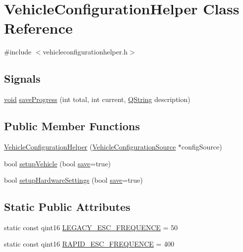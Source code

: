 \hypertarget{class_vehicle_configuration_helper}{\section{\-Vehicle\-Configuration\-Helper \-Class \-Reference}
\label{class_vehicle_configuration_helper}
}


{\ttfamily \#include $<$vehicleconfigurationhelper.\-h$>$}

\subsection*{\-Signals}
\begin{DoxyCompactItemize}
\item 
\hyperlink{group___u_a_v_objects_plugin_ga444cf2ff3f0ecbe028adce838d373f5c}{void} \hyperlink{group___vehicle_configuration_helper_ga7ec52f13c4dee3a474698106c2ca3bf4}{save\-Progress} (int total, int current, \hyperlink{group___u_a_v_objects_plugin_gab9d252f49c333c94a72f97ce3105a32d}{\-Q\-String} description)
\end{DoxyCompactItemize}
\subsection*{\-Public \-Member \-Functions}
\begin{DoxyCompactItemize}
\item 
\hyperlink{group___vehicle_configuration_helper_ga8d0681e69a65e5d227b2255abe8bb982}{\-Vehicle\-Configuration\-Helper} (\hyperlink{class_vehicle_configuration_source}{\-Vehicle\-Configuration\-Source} $\ast$config\-Source)
\item 
bool \hyperlink{group___vehicle_configuration_helper_gaa307534a6b38e5b7e67060bc8d381b09}{setup\-Vehicle} (bool \hyperlink{uavobjecttemplate_8m_a79178933c5b76091ca04178d14a5ba98}{save}=true)
\item 
bool \hyperlink{group___vehicle_configuration_helper_ga2762da9776a1c2608786cb7b1ff6ca6c}{setup\-Hardware\-Settings} (bool \hyperlink{uavobjecttemplate_8m_a79178933c5b76091ca04178d14a5ba98}{save}=true)
\end{DoxyCompactItemize}
\subsection*{\-Static \-Public \-Attributes}
\begin{DoxyCompactItemize}
\item 
static const qint16 \hyperlink{group___vehicle_configuration_helper_ga1ab33357e7669d7825cadb88ff666f98}{\-L\-E\-G\-A\-C\-Y\-\_\-\-E\-S\-C\-\_\-\-F\-R\-E\-Q\-U\-E\-N\-C\-E} = 50
\item 
static const qint16 \hyperlink{group___vehicle_configuration_helper_ga5bdfa86a19f74eae8f6b44ac63d640f2}{\-R\-A\-P\-I\-D\-\_\-\-E\-S\-C\-\_\-\-F\-R\-E\-Q\-U\-E\-N\-C\-E} = 400
\end{DoxyCompactItemize}


